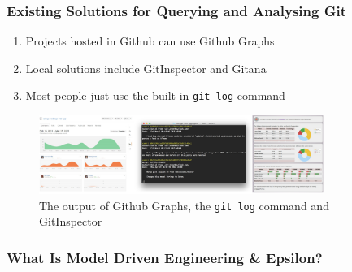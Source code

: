 \documentclass[aspectratio=1610]{beamer}
\newcommand{\code}[1]{\texttt{#1}}
\begin{document}
\begin{frame}
	\frametitle{Existing Solutions for Querying and Analysing Git}
	\begin{enumerate}
		\item Projects hosted in Github can use Github Graphs
		\item Local solutions include GitInspector and Gitana
		\item Most people just use the built in \code{git log} command
	\end{enumerate}
	\begin{figure}[H]
		\centering
		\includegraphics[width=350px]{images/existingsolutions}
		\caption{The output of Github Graphs, the \code{git log} command and GitInspector}
	\end{figure}
\end{frame}

\begin{frame}
	\frametitle{What Is Model Driven Engineering \& Epsilon?}
	
\end{frame}

\begin{frame}[containsverbatim]
	\begin{lstlisting}[caption=An advanced Git query in EOL, label=lst:exampleCode]
	
	\end{lstlisting}
\end{frame}
\end{document}
